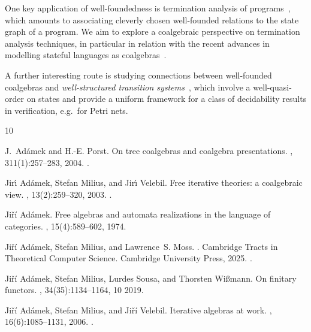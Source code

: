 \documentclass[10pt,a4paper]{article}
\theoremstyle{definition}
\theoremstyle{remark}
\numberwithin{equation}{section}
\theoremstyle{plain}
\theoremstyle{definition}
\begin{document}
One key application of well-foundedness is termination analysis of programs~\cite{cpr11}, which amounts to associating cleverly chosen well-founded relations to the state graph of a program. We aim to explore a coalgebraic perspective on termination analysis techniques, in particular in relation with the recent advances in modelling stateful languages as coalgebras~\cite{gmstu25}. 

A further interesting route is studying connections between well-founded coalgebras and \emph{well-structured transition systems}~\cite{fs01}, which involve a well-quasi-order on states and provide a uniform framework for a class of decidability results in verification, e.g.~for Petri nets.




\providecommand{\noopsort}[1]{}
\begin{thebibliography}{10}

J.~Ad\'amek and H.-E. Porst.
\newblock On tree coalgebras and coalgebra presentations.
, 311(1):257--283, 2004.
\newblock \href {https://doi.org/10.1016/S0304-3975(03)00378-5}
  {}.

Jir\'{\i} Ad\'{a}mek, Stefan Milius, and Jir\'{\i} Velebil.
\newblock Free iterative theories: a coalgebraic view.
, 13(2):259–320, 2003.
\newblock \href {https://doi.org/10.1017/S0960129502003924}
  {}.

Ji\v{r}\'i Ad\'amek.
\newblock Free algebras and automata realizations in the language of
  categories.
, 15(4):589--602, 1974.

Ji\v{r}\'i Ad\'amek, Stefan Milius, and Lawrence~S. Moss.
.
\newblock Cambridge Tracts in Theoretical Computer Science. Cambridge
  University Press, 2025.
\newblock \href {https://doi.org/10.1017/9781108884112}
  {}.

Ji\v{r}\'i{} Ad\'amek, Stefan Milius, Lurdes Sousa, and Thorsten Wi{\ss}mann.
\newblock On finitary functors.
, 34(35):1134--1164, 10 2019.

Ji\v{r}\'i Ad\'amek, Stefan Milius, and Ji\v{r}\'i Velebil.
\newblock Iterative algebras at work.
, 16(6):1085–1131, 2006.
\newblock \href {https://doi.org/10.1017/S0960129506005706}
  {}.


\end{thebibliography}
\end{document}
